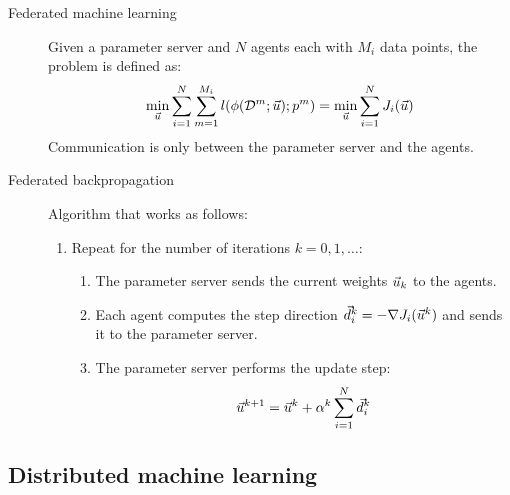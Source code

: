 \begin{description}
    \item[Federated machine learning] 
        Given a parameter server and $N$ agents each with $M_i$ data points, the problem is defined as:
        \[ \min_{\vec{u}} \sum_{i=1}^{N} \sum_{m=1}^{M_i} l(\phi(\mathcal{D}^m; {\vec{u}}); p^m) = \min_{\vec{u}} \sum_{i=1}^{N} J_i({\vec{u}}) \]
        Communication is only between the parameter server and the agents.

    \item[Federated backpropagation] 
        Algorithm that works as follows:
        \begin{enumerate}
            \item Repeat for the number of iterations $k = 0, 1, \dots$:
            \begin{enumerate}
                \item The parameter server sends the current weights ${\vec{u}}_k$ to the agents.
                \item Each agent computes the step direction $\vec{d}_i^k = -\nabla J_i({\vec{u}}^k)$ and sends it to the parameter server.
                \item The parameter server performs the update step:
                \[ {\vec{u}}^{k+1} = {\vec{u}}^k + \alpha^k \sum_{i=1}^{N} \vec{d}_i^k \]
            \end{enumerate}
        \end{enumerate}
\end{description}


\subsection{Distributed machine learning}

